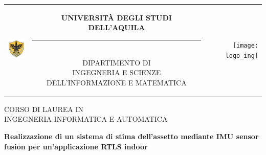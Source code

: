 \begin{titlepage}

\begin{center}
\normalsize

\begin{center}
\begin{tabular}[t]{@{} l @{} c @{} r @{}}
\parbox[c]{0.15\textwidth}{\raggedright \includegraphics[width=0.60in]{logo_univ}}
&
\parbox[c]{0.7\textwidth}
{
\centering \bfseries
UNIVERSITÀ DEGLI STUDI DELL'AQUILA \\[-5pt]
\rule{0.65\textwidth}{1pt} \\
{\scshape DIPARTIMENTO DI \\ INGEGNERIA E SCIENZE DELL'INFORMAZIONE E MATEMATICA }
}
&
\parbox[c]{0.15\textwidth}{\raggedleft \texttt{[image: logo\_ing]}}
\end{tabular}
\end{center}

\bigskip \bigskip



\bigskip \bigskip

{\small CORSO DI LAUREA IN} \\
INGEGNERIA INFORMATICA E AUTOMATICA

\vfil \vfil \vfil

{\bfseries \large
Realizzazione di un sistema di stima dell'assetto mediante IMU sensor fusion
per un'applicazione RTLS indoor\\
}

\vfil \vfil \vfil

\end{center}
\end{titlepage}
